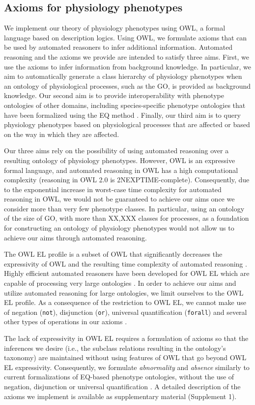 \documentclass{bioinfo}
\renewcommand{\cite}{\citep}
\begin{document}
\begin{methods}
\subsection{Axioms for physiology phenotypes}
We implement our theory of physiology phenotypes using OWL, a formal
language based on description logics. Using OWL, we formulate axioms
that can be used by automated reasoners to infer additional
information. Automated reasoning and the axioms we provide are
intended to satisfy three aims. First, we use the axioms to infer
information from background knowledge. In particular, we aim to
automatically generate a class hierarchy of physiology phenotypes when
an ontology of physiological processes, such as the GO, is provided as
background knowledge. Our second aim is to provide interoperability
with phenotype ontologies of other domains, including species-specific
phenotype ontologies that have been formalized using the EQ method
\cite{Mungall2010, Gkoutos2005}. Finally, our third aim is to query
physiology phenotypes based on physiological processes that are
affected or based on the way in which they are affected. 

Our three aims rely on the possibility of using automated reasoning
over a resulting ontology of physiology phenotypes.  However, OWL is
an expressive formal language, and automated reasoning in OWL has a
high computational complexity (reasoning in OWL 2.0 is
2NEXPTIME-complete). Consequently, due to the exponential increase in
worst-case time complexity for automated reasoning in OWL, we would
not be guaranteed to achieve our aims once we consider more than very
few phenotype classes. In particular, using an ontology of the size of
GO, with more than XX,XXX classes for processes, as a foundation for
constructing an ontology of physiology phenotypes would not allow us
to achieve our aims through automated reasoning. 

The OWL EL profile is a subset of OWL that significantly decreases the
expressivity of OWL and the resulting time complexity of automated
reasoning \cite{owlprofiles}. Highly efficient automated reasoners
have been developed for OWL EL which are capable of processing very
large ontologies \cite{Kazakov2011}. In order to achieve our aims and
utilize automated reasoning for large ontologies, we limit ourselves
to the OWL EL profile. As a consequence of the restriction to OWL EL,
we cannot make use of negation ({\tt not}), disjunction ({\tt or}),
universal quantification ({\tt forall}) and several other types of
operations in our axioms \cite{owlprofiles}.

The lack of expressivity in OWL EL requires a formulation of axioms so
that the inferences we desire (i.e., the subclass relations resulting
in the ontology's taxonomy) are maintained without using features of
OWL that go beyond OWL EL expressivity. Consequently, we formulate
{\em abnormality} and {\em absence} similarly to current
formalizations of EQ-based phenotype ontologies, without the use of
negation, disjunction or universal quantification
\cite{Mungall2010}. A detailed description of the axioms we implement
is available as supplementary material (Supplement 1).
\end{methods}
\end{document}
